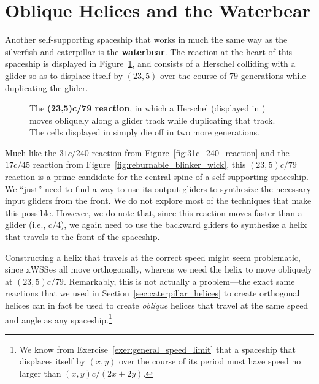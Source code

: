 \section{Oblique Helices and the Waterbear}\label{sec:waterbear}

Another self-supporting spaceship that works in much the same way as the silverfish and caterpillar is the \textbf{waterbear}. The reaction at the heart of this spaceship is displayed in Figure~\ref{fig:23_5c_79_reaction}, and consists of a Herschel colliding with a glider so as to displace itself by $(23,5)$ over the course of $79$ generations while duplicating the glider.

\begin{figure}[!htb]
	\centering
	\caption{The \textbf{(23,5)c/79 reaction}, in which a Herschel (displayed in ) moves obliquely along a glider track while duplicating that track. The cells displayed in  simply die off in two more generations.}\label{fig:23_5c_79_reaction}
\end{figure}

Much like the $31c/240$ reaction from Figure~\ref{fig:31c_240_reaction} and the $17c/45$ reaction from Figure~\ref{fig:reburnable_blinker_wick}, this $(23,5)c/79$ reaction is a prime candidate for the central spine of a self-supporting spaceship. We ``just'' need to find a way to use its output gliders to synthesize the necessary input gliders from the front. We do not explore most of the techniques that make this possible. However, we do note that, since this reaction moves faster than a glider (i.e., $c/4$), we again need to use the backward gliders to synthesize a helix that travels to the front of the spaceship.

Constructing a helix that travels at the correct speed might seem problematic, since xWSSes all move orthogonally, whereas we need the helix to move obliquely at $(23,5)c/79$. Remarkably, this is not actually a problem---the exact same reactions that we used in Section~\ref{sec:caterpillar_helices} to create orthogonal helices can in fact be used to create \emph{oblique} helices that travel at the same speed and angle as any spaceship.\footnote{We know from Exercise~\ref{exer:general_speed_limit} that a spaceship that displaces itself by $(x,y)$ over the course of its period must have speed no larger than $(x,y)c/(2x+2y)$.}

